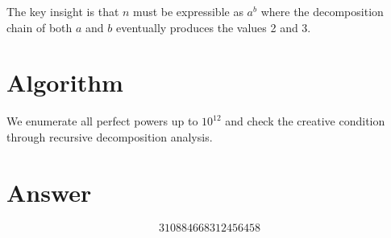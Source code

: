 \documentclass[12pt]{article}
\begin{document}
The key insight is that $n$ must be expressible as $a^b$ where the decomposition chain of both $a$ and $b$ eventually produces the values 2 and 3.

\section{Algorithm}
We enumerate all perfect powers up to $10^{12}$ and check the creative condition through recursive decomposition analysis.

\section{Answer}

\[
\boxed{310884668312456458}
\]
\end{document}
